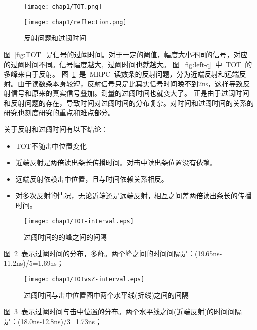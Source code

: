 \begin{figure}[!h]
\begin{minipage}[!h]{0.5\linewidth}
\texttt{[image: chap1/TOT.png]}
\label{fig:TOT}
\end{minipage}
\hfill
\begin{minipage}[!h]{0.5\linewidth}
\texttt{[image: chap1/reflection.png]}
\label{fig:reflection}
\end{minipage}%
\caption{反射问题和过阈时间}
\end{figure}


图~\ref{fig:TOT}~是信号的过阈时间。对于一定的阈值，幅度大小不同的信号，对应的过阈时间不同。信号幅度越大，过阈时间也就越大。
图~\ref{fig:left-q}~中~TOT~的多峰来自于反射。
图~\ref{fig:reflection}~是~MRPC~读数条的反射问题，分为近端反射和远端反射。由于读数条本身较短，反射信号只是比真实信号时间晚不到2ns，这样导致反射信号和原来的真实信号叠加。测量的过阈时间也就变大了。
正是由于过阈时间和反射问题的存在，导致时间对过阈时间的分布复杂。对时间和过阈时间的关系的研究也刻度研究的重点和难点部分。

关于反射和过阈时间有以下结论：
\begin{itemize}
\item{TOT不随击中位置变化}
\item{近端反射是两倍读出条长传播时间。对击中读出条位置没有依赖。}
\item{远端反射依赖击中位置，且与时间依赖关系相反。}
\item{对多次反射的情况，无论近端还是远端反射，相互之间差两倍读出条长的传播时间。}
\end{itemize}

\begin{figure}[!h]
  \centering
  \texttt{[image: chap1/TOT-interval.eps]}
  \caption{过阈时间的的峰之间的间隔}
  \label{fig:TOT-interval}
\end{figure}
图~\ref{fig:TOT-interval}~表示过阈时间的分布，多峰。两个峰之间的时间间隔是：(19.65ns-11.2ns)/5=1.69ns；

\begin{figure}[!h]
  \centering
  \texttt{[image: chap1/TOTvsZ-interval.eps]}
  \caption{过阈时间与击中位置图中两个水平线(折线)之间的间隔}
  \label{fig:TOTvsZ-interval}
\end{figure}
图~\ref{fig:TOTvsZ-interval}~表示过阈时间与击中位置的分布。两个水平线之间(近端反射)的时间间隔是：(18.0ns-12.8ns)/3=1.73ns；

